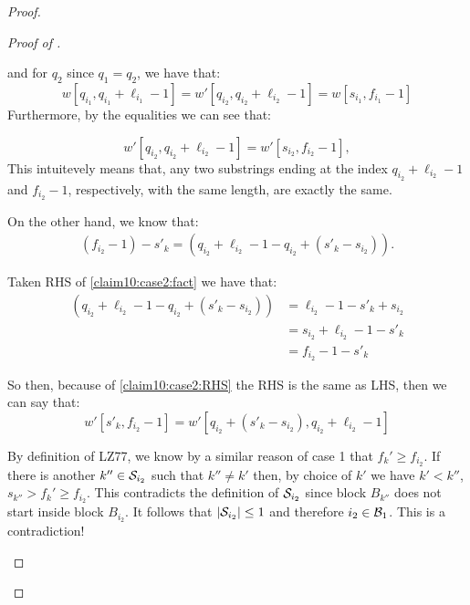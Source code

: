 \begin{proof}
\begin{proof}[Proof of ]
\begin{enumerate}
and for $q_2$ since $q_1=q_2$, we have that: 
\[w[q_{i_1},q_{i_1}+\ell_{i_1}-1]=w'[q_{i_2},q_{i_2}+\ell_{i_2}-1]=w[s_{i_1},f_{i_1}-1]\]
Furthermore, by the equalities we can see that:

\begin{equation}
  w'[q_{i_2},q_{i_2}+\ell_{i_2}-1] = w'[s_{i_2},f_{i_2}-1],
  \label{claim10:case2}
\end{equation}
This intuitevely means that, any two substrings ending at the index $q_{i_2}+\ell_{i_2}-1$ and $f_{i_2}-1$, respectively, with the same length, are exactly the same. 

On the other hand, we know that:
\begin{align}
  (f_{i_2}-1)-s'_k = (q_{i_2}+\ell_{i_2}-1-q_{i_2}+(s'_k-s_{i_2})).
  \label{claim10:case2:fact}
\end{align}

Taken RHS of \eqref{claim10:case2:fact} we have that:
\begin{align}
   (q_{i_2}+\ell_{i_2}-1-q_{i_2}+(s'_k-s_{i_2}))&=\ell_{i_2}-1-s'_k+s_{i_2}\nonumber \\
   &= s_{i_2}+\ell_{i_2}-1-s'_k\nonumber \\
   &=f_{i_2}-1-s'_k
   \label{claim10:case2:RHS}
\end{align}

So then, because of \eqref{claim10:case2:RHS} the RHS is the same as LHS, then we can say that:
\begin{equation}
w'[s'_k, f_{i_2} - 1] = w'[q_{i_2} + (s'_k - s_{i_2}), q_{i_2} + \ell_{i_2} - 1]
\end{equation}

  


By definition of LZ77, we know by a similar reason of case 1 that $f_k' \geq f_{i_2}$. If there is another $k'' \in \S_{i_2}$ such that $k'' \neq k'$ then, by choice of $k'$ we have $k'<k''$, $s_{k''} > f_k' \geq f_{i_2}$. This contradicts the definition of $\S_{i_2}$ since block $B_{k''}$ does not start inside block $B_{i_2}$. It follows that $\left| \S_{i_2}\right| \leq 1$ and therefore $i_2\in\B_1$. This is a contradiction!


\end{enumerate}
\end{proof}
\end{proof}
